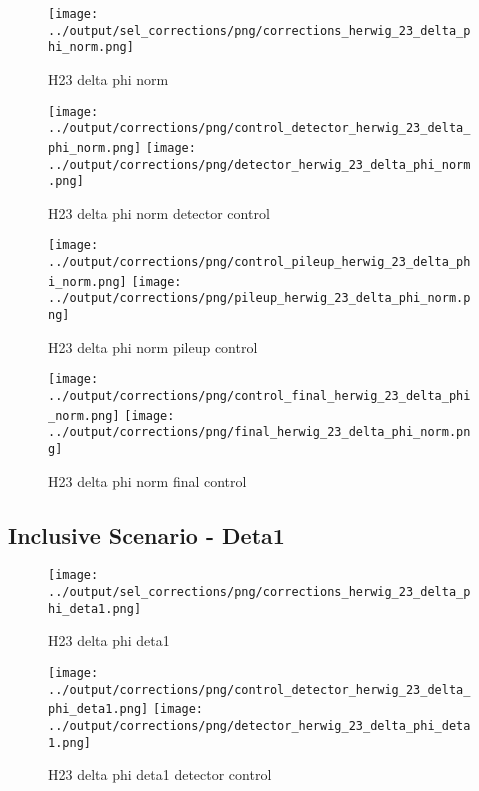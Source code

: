 \documentclass[11pt]{book}
\begin{document}
\begin{figure}[ht]
\centering
\texttt{[image: ../output/sel\_corrections/png/corrections\_herwig\_23\_delta\_phi\_norm.png]}
\caption{H23 delta phi norm}
\label{fig:H23_delta_phi_norm}
\end{figure}

\begin{figure}[ht]
\centering
\texttt{[image: ../output/corrections/png/control\_detector\_herwig\_23\_delta\_phi\_norm.png]}
\texttt{[image: ../output/corrections/png/detector\_herwig\_23\_delta\_phi\_norm.png]}
\caption{H23 delta phi norm detector control}
\label{fig:H23_delta_phi_norm_detector_control}
\end{figure}

\begin{figure}[ht]
\centering
\texttt{[image: ../output/corrections/png/control\_pileup\_herwig\_23\_delta\_phi\_norm.png]}
\texttt{[image: ../output/corrections/png/pileup\_herwig\_23\_delta\_phi\_norm.png]}
\caption{H23 delta phi norm pileup control}
\label{fig:H23_delta_phi_norm_pileup_control}
\end{figure}

\begin{figure}[ht]
\centering
\texttt{[image: ../output/corrections/png/control\_final\_herwig\_23\_delta\_phi\_norm.png]}
\texttt{[image: ../output/corrections/png/final\_herwig\_23\_delta\_phi\_norm.png]}
\caption{H23 delta phi norm final control}
\label{fig:H23_delta_phi_norm_final_control}
\end{figure}

\clearpage
\subsection{Inclusive Scenario - Deta1}
\begin{figure}[ht]
\centering
\texttt{[image: ../output/sel\_corrections/png/corrections\_herwig\_23\_delta\_phi\_deta1.png]}
\caption{H23 delta phi deta1}
\label{fig:H23_delta_phi_deta1}
\end{figure}

\begin{figure}[ht]
\centering
\texttt{[image: ../output/corrections/png/control\_detector\_herwig\_23\_delta\_phi\_deta1.png]}
\texttt{[image: ../output/corrections/png/detector\_herwig\_23\_delta\_phi\_deta1.png]}
\caption{H23 delta phi deta1 detector control}
\label{fig:H23_delta_phi_deta1_detector_control}
\end{figure}
\end{document}

